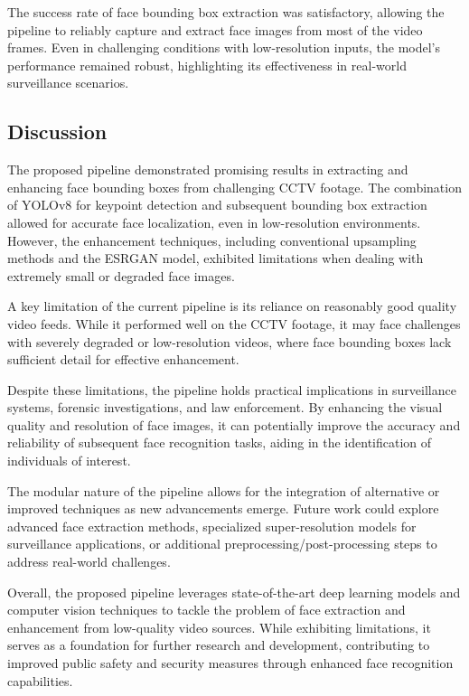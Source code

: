 The success rate of face bounding box extraction was satisfactory, allowing the pipeline to reliably capture and extract face images from most of the video frames. Even in challenging conditions with low-resolution inputs, the model's performance remained robust, highlighting its effectiveness in real-world surveillance scenarios.

\subsection{Discussion}

The proposed pipeline demonstrated promising results in extracting and enhancing face bounding boxes from challenging CCTV footage. The combination of YOLOv8 for keypoint detection and subsequent bounding box extraction allowed for accurate face localization, even in low-resolution environments. However, the enhancement techniques, including conventional upsampling methods and the ESRGAN model, exhibited limitations when dealing with extremely small or degraded face images.

A key limitation of the current pipeline is its reliance on reasonably good quality video feeds. While it performed well on the CCTV footage, it may face challenges with severely degraded or low-resolution videos, where face bounding boxes lack sufficient detail for effective enhancement.

Despite these limitations, the pipeline holds practical implications in surveillance systems, forensic investigations, and law enforcement. By enhancing the visual quality and resolution of face images, it can potentially improve the accuracy and reliability of subsequent face recognition tasks, aiding in the identification of individuals of interest.

The modular nature of the pipeline allows for the integration of alternative or improved techniques as new advancements emerge. Future work could explore advanced face extraction methods, specialized super-resolution models for surveillance applications, or additional preprocessing/post-processing steps to address real-world challenges.

Overall, the proposed pipeline leverages state-of-the-art deep learning models and computer vision techniques to tackle the problem of face extraction and enhancement from low-quality video sources. While exhibiting limitations, it serves as a foundation for further research and development, contributing to improved public safety and security measures through enhanced face recognition capabilities.